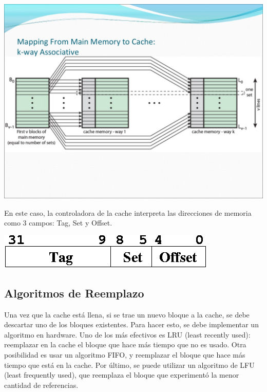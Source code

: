 \begin{center}
\includegraphics[scale=0.3]{./Graficos/asociativa_por_conjuntos_2.jpg} 
\end{center}

En este caso, la controladora de la cache interpreta las direcciones de memoria como 3 campos: Tag, Set y Offset.


\begin{center}
\includegraphics[scale=0.5]{./Graficos/asociativa_por_conjuntos_3.png} 
\end{center}

\newpage
\subsection{Algoritmos de Reemplazo}

Una vez que la cache est\'a llena, si se trae un nuevo bloque a la cache, se debe descartar uno de los bloques existentes. Para hacer esto,
se debe implementar un algoritmo en hardware. Uno de los m\'as efectivos es LRU (least recently used): reemplazar en la cache el bloque
que hace m\'as tiempo que no es usado. Otra posibilidad es usar un algoritmo FIFO, y reemplazar el bloque que hace m\'as tiempo que
est\'a en la cache. Por \'ultimo, se puede utilizar un algoritmo de LFU (least frequently used), que reemplaza el bloque que experiment\'o
la menor cantidad de referencias.


